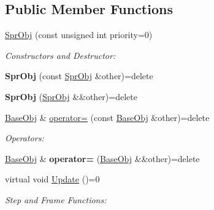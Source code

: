 \subsection*{Public Member Functions}
\begin{DoxyCompactItemize}
\item 
\hypertarget{class_helios_1_1_spr_obj_a25235d4dbfaeda9dfc1c157b2e6ebb05}{}\hyperlink{class_helios_1_1_spr_obj_a25235d4dbfaeda9dfc1c157b2e6ebb05}{Spr\+Obj} (const unsigned int priority=0)\label{class_helios_1_1_spr_obj_a25235d4dbfaeda9dfc1c157b2e6ebb05}

\begin{DoxyCompactList}\small\item\em Constructors and Destructor\+: \end{DoxyCompactList}\item 
\hypertarget{class_helios_1_1_spr_obj_ab803d71e66b25686f4d6a29c1f3ee0d6}{}{\bfseries Spr\+Obj} (const \hyperlink{class_helios_1_1_spr_obj}{Spr\+Obj} \&other)=delete\label{class_helios_1_1_spr_obj_ab803d71e66b25686f4d6a29c1f3ee0d6}

\item 
\hypertarget{class_helios_1_1_spr_obj_ab0a6136a689b13a5ab16270df52a303a}{}{\bfseries Spr\+Obj} (\hyperlink{class_helios_1_1_spr_obj}{Spr\+Obj} \&\&other)=delete\label{class_helios_1_1_spr_obj_ab0a6136a689b13a5ab16270df52a303a}

\item 
\hypertarget{class_helios_1_1_spr_obj_a89e23d41b2a2b4262ed68b9c81cdbe42}{}\hyperlink{class_helios_1_1_base_obj}{Base\+Obj} \& \hyperlink{class_helios_1_1_spr_obj_a89e23d41b2a2b4262ed68b9c81cdbe42}{operator=} (const \hyperlink{class_helios_1_1_base_obj}{Base\+Obj} \&other)=delete\label{class_helios_1_1_spr_obj_a89e23d41b2a2b4262ed68b9c81cdbe42}

\begin{DoxyCompactList}\small\item\em Operators\+: \end{DoxyCompactList}\item 
\hypertarget{class_helios_1_1_spr_obj_a99d676eda512fa5dbc026ca6db1bfcb0}{}\hyperlink{class_helios_1_1_base_obj}{Base\+Obj} \& {\bfseries operator=} (\hyperlink{class_helios_1_1_base_obj}{Base\+Obj} \&\&other)=delete\label{class_helios_1_1_spr_obj_a99d676eda512fa5dbc026ca6db1bfcb0}

\item 
virtual void \hyperlink{class_helios_1_1_spr_obj_a5ea59f62cf7bb7bd7ff8080a79894037}{Update} ()=0
\begin{DoxyCompactList}\small\item\em Step and Frame Functions\+: \end{DoxyCompactList}\end{DoxyCompactItemize}
